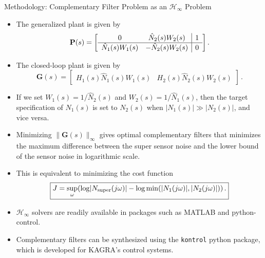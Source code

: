 \documentclass{beamer}
\begin{document}
\begin{frame}[t]
\begin{columns}[t]
\begin{column}{0.32\linewidth}
\begin{block}{Methodology: Complementary Filter Problem as an $\mathcal{H}_\infty$ Problem}
			\medskip
			
			\begin{itemize}
				\item 	The generalized plant is given by
				\begin{equation}
					\mathbf{P}(s) = 
					\mleft[
					\begin{array}{cc|c}
						0 & \hat{N}_2(s) W_2(s) & 1 \\
						\hline
						\hat{N}_1(s) W_1(s) & -\hat{N}_2(s) W_2(s) & 0 \\
					\end{array}\mright]\,.
					\label{eqn:generalized_plant_complementary_filter}
				\end{equation}
				
				\item The closed-loop plant is given by
				\begin{equation}
					\mathbf{G}(s) =
					\begin{bmatrix}
						H_1(s)\hat{N}_1(s)W_1(s) & H_2(s)\hat{N}_2(s)W_2(s)
					\end{bmatrix}\,. 
				\end{equation}
			
				\item 	If we set $W_1(s)=1/\hat{N}_2(s)$ and $W_2(s)=1/\hat{N}_1(s)$, then the target specification of $N_1(s)$ is set to $N_2(s)$ when $\lvert N_1(s) \rvert \gg \lvert N_2(s) \rvert$, and vice versa.
				
				\item Minimizing $\lVert \mathbf{G}(s) \rVert_\infty$ gives optimal complementary filters that minimizes the maximum difference between the super sensor noise and the lower bound of the sensor noise in logarithmic scale.
				
				\item This is equivalent to minimizing the cost function
				\begin{equation}
					\boxed{
						J = \sup_\omega\mleft(\log \lvert N_\mathrm{super}(j\omega)\rvert-\log\min(\lvert N_1(j\omega) \rvert, \lvert 		N_2(j\omega)\rvert)\mright)\,.
					}
				\end{equation}
				
				\item $\mathcal{H}_\infty$ solvers are readily available in packages such as MATLAB and python-control.
				
				\item Complementary filters can be synthesized using the \texttt{kontrol} python package, which is developed for KAGRA's control systems.
				

\end{itemize}
\end{block}
\end{column}
\end{columns}
\end{frame}
\end{document}
